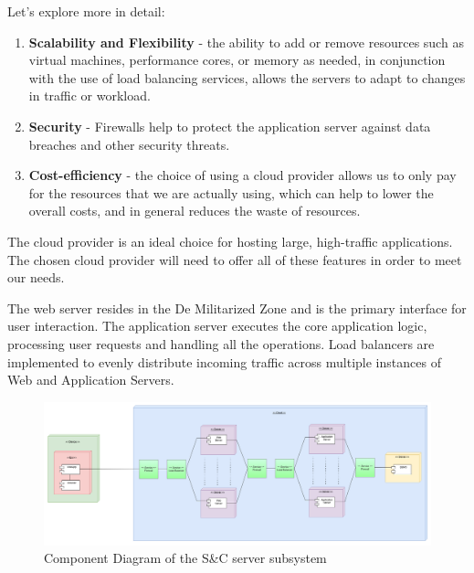 \documentclass[a4paper,12pt]{article}
\begin{document}
Let's explore more in detail:

\begin{enumerate}
    \item \textbf{Scalability and Flexibility} - the ability to add or remove resources such as virtual machines, performance cores, or memory as needed, in conjunction with the use of load balancing services, allows the servers to adapt to changes in traffic or workload.
    \item \textbf{Security} - Firewalls help to protect the application server against data breaches and other security threats.
    \item \textbf{Cost-efficiency} - the choice of using a cloud provider allows us to only pay for the resources that we are actually using, which can help to lower the overall costs, and in general reduces the waste of resources.
\end{enumerate}

The cloud provider is an ideal choice for hosting large, high-traffic applications. The chosen cloud provider will need to offer all of these features in order to meet our needs.

The web server resides in the De Militarized Zone and is the primary interface for user interaction. The application server executes the core application logic, processing user requests and handling all the operations. Load balancers are implemented to evenly distribute incoming traffic across multiple instances of Web and Application Servers.
\begin{figure}[H]
    \centering
    \includegraphics[scale = 0.33]{DD_figures/SingleDiagrams/DeploymentView.png}
    \caption{Component Diagram of the S\&C server subsystem}
    \centering
\end{figure}
\end{document}
